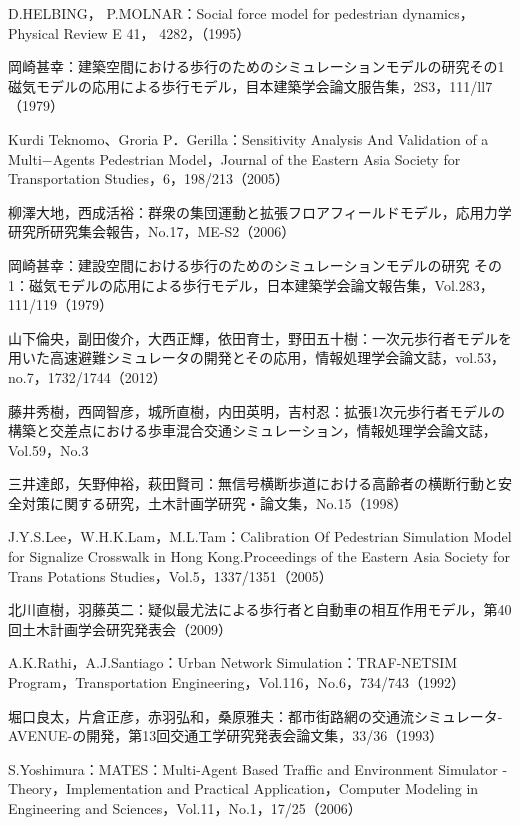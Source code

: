\begin{thebibliography}{99}
  D.HELBING， P.MOLNAR：Social force model for pedestrian dynamics， Physical Review E 41， 4282，（1995）

  岡崎甚幸：建築空間における歩行のためのシミュレーションモデルの研究その1 磁気モデルの応用による歩行モデル，目本建築学会論文服告集，2S3，111/ll7（1979）

  Kurdi Teknomo、Groria P．Gerilla：Sensitivity Analysis And Validation of a Multi−Agents Pedestrian Model，Journal of the Eastern Asia Society for Transportation Studies，6，198/213（2005）

  柳澤大地，西成活裕：群衆の集団運動と拡張フロアフィールドモデル，応用力学研究所研究集会報告，No.17，ME-S2（2006）

  岡崎甚幸：建設空間における歩行のためのシミュレーションモデルの研究 その1：磁気モデルの応用による歩行モデル，日本建築学会論文報告集，Vol.283，111/119（1979）

  山下倫央，副田俊介，大西正輝，依田育士，野田五十樹：一次元歩行者モデルを用いた高速避難シミュレータの開発とその応用，情報処理学会論文誌，vol.53，no.7，1732/1744（2012）

  藤井秀樹，西岡智彦，城所直樹，内田英明，吉村忍：拡張1次元歩行者モデルの構築と交差点における歩車混合交通シミュレーション，情報処理学会論文誌，Vol.59，No.3

  三井達郎，矢野伸裕，萩田賢司：無信号横断歩道における高齢者の横断行動と安全対策に関する研究，土木計画学研究・論文集，No.15（1998）

  J.Y.S.Lee，W.H.K.Lam，M.L.Tam：Calibration Of Pedestrian Simulation Model for Signalize Crosswalk in Hong Kong.Proceedings of the Eastern Asia Society for Trans Potations Studies，Vol.5，1337/1351（2005）

  北川直樹，羽藤英二：疑似最尤法による歩行者と自動車の相互作用モデル，第40回土木計画学会研究発表会（2009）

  A.K.Rathi，A.J.Santiago：Urban Network Simulation：TRAF-NETSIM Program，Transportation Engineering，Vol.116，No.6，734/743（1992）

  堀口良太，片倉正彦，赤羽弘和，桑原雅夫：都市街路網の交通流シミュレータ-AVENUE-の開発，第13回交通工学研究発表会論文集，33/36（1993）

  S.Yoshimura：MATES：Multi-Agent Based Traffic and Environment Simulator - Theory，Implementation and Practical Application，Computer Modeling in Engineering and Sciences，Vol.11，No.1，17/25（2006）


\end{thebibliography}
